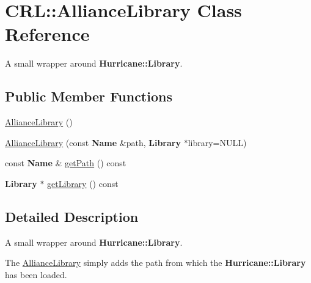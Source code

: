 \hypertarget{classCRL_1_1AllianceLibrary}{\section{C\-R\-L\-:\-:Alliance\-Library Class Reference}
\label{classCRL_1_1AllianceLibrary}
}


A small wrapper around {\bf Hurricane\-::\-Library}.  


\subsection*{Public Member Functions}
\begin{DoxyCompactItemize}
\item 
\hyperlink{classCRL_1_1AllianceLibrary_ad7394ba603e21e655d4518795650f042}{Alliance\-Library} ()
\item 
\hyperlink{classCRL_1_1AllianceLibrary_a1a0c9a0f2b74eaae859206e5338107a0}{Alliance\-Library} (const {\bf Name} \&path, {\bf Library} $\ast$library=N\-U\-L\-L)
\item 
const {\bf Name} \& \hyperlink{classCRL_1_1AllianceLibrary_ad663c361c6bf8eff7c56a68e3c977c21}{get\-Path} () const 
\item 
{\bf Library} $\ast$ \hyperlink{classCRL_1_1AllianceLibrary_a555c2ca823587050b997ef3b31a510e6}{get\-Library} () const 
\end{DoxyCompactItemize}


\subsection{Detailed Description}
A small wrapper around {\bf Hurricane\-::\-Library}. 

The \hyperlink{classCRL_1_1AllianceLibrary}{Alliance\-Library} simply adds the path from which the {\bf Hurricane\-::\-Library} has been loaded. 

